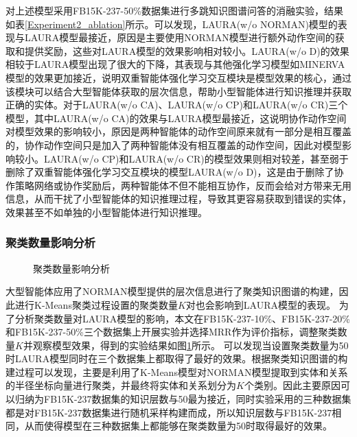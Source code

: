 \documentclass[algorithmlist, AutoFakeBold, AutoFakeSlant, figurelist, tablelist, nomlist, engineering]{seuthesix}
\begin{document}
对上述模型采用FB15K-237-50\%数据集进行多跳知识图谱问答的消融实验，结果如表\ref{Experiment2_ablation}所示。可以发现，LAURA(w/o NORMAN)模型的表现与LAURA模型最接近，原因是主要使用NORMAN模型进行额外动作空间的获取和提供奖励，这些对LAURA模型的效果影响相对较小。LAURA(w/o D)的效果相较于LAURA模型出现了很大的下降，其表现与其他强化学习模型如MINERVA模型的效果更加接近，说明双重智能体强化学习交互模块是模型效果的核心，通过该模块可以结合大型智能体获取的层次信息，帮助小型智能体进行知识推理并获取正确的实体。对于LAURA(w/o CA)、LAURA(w/o CP)和LAURA(w/o CR)三个模型，其中LAURA(w/o CA)的效果与LAURA模型最接近，这说明协作动作空间对模型效果的影响较小，原因是两种智能体的动作空间原来就有一部分是相互覆盖的，协作动作空间只是加入了两种智能体没有相互覆盖的动作空间，因此对模型影响较小。LAURA(w/o CP)和LAURA(w/o CR)的模型效果则相对较差，甚至弱于删除了双重智能体强化学习交互模块的模型LAURA(w/o D)，这是由于删除了协作策略网络或协作奖励后，两种智能体不但不能相互协作，反而会给对方带来无用信息，从而干扰了小型智能体的知识推理过程，导致其更容易获取到错误的实体，效果甚至不如单独的小型智能体进行知识推理。

\subsubsection{聚类数量影响分析}
\begin{figure}[t]
  \centering
  \caption{聚类数量影响分析}
  \label{Experiment2_layer}
\end{figure}
大型智能体应用了NORMAN模型提供的层次信息进行了聚类知识图谱的构建，因此进行K-Means聚类过程设置的聚类数量$K$对也会影响到LAURA模型的表现。
为了分析聚类数量对LAURA模型的影响，本文在FB15K-237-10\%、FB15K-237-20\%和FB15K-237-50\%三个数据集上开展实验并选择MRR作为评价指标，调整聚类数量$K$并观察模型效果，得到的实验结果如图\ref{Experiment2_layer}所示。
可以发现当设置聚类数量为50时LAURA模型同时在三个数据集上都取得了最好的效果。根据聚类知识图谱的构建过程可以发现，主要是利用了K-Means模型对NORMAN模型提取到实体和关系的半径坐标向量进行聚类，并最终将实体和关系划分为$K$个类别。因此主要原因可以归纳为FB15K-237数据集的知识层数与50最为接近，同时实验采用的三种数据集都是对FB15K-237数据集进行随机采样构建而成，所以知识层数与FB15K-237相同，从而使得模型在三种数据集上都能够在聚类数量为50时取得最好的效果。
\end{document}
